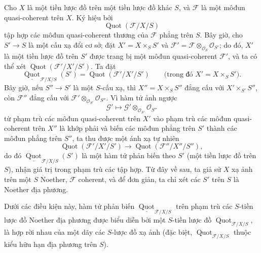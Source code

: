 
Cho $X$ là một tiền lược đồ trên một tiền lược đồ khác $S$, và $\mathcal F$ là
một môđun quasi-coherent trên $X$. Ký hiệu bởi
\[
\operatorname{Quot}(\mathcal F/X/S)
\]
tập hợp các môđun quasi-coherent thương của $\mathcal F$ phẳng trên $S$. Bây
giờ, cho $S'\longrightarrow S$ là một cấu xạ đổi cơ sở; đặt
$X'=X\times_S S'$ và
$\mathcal F'=\mathcal F\otimes_{\mathcal O_S}\mathcal O_{S'}$; do đó, $X'$
là một tiền lược đồ trên $S'$ được trang bị một môđun
quasi-coherent $\mathcal F'$, và ta có thể xét
$\operatorname{Quot}(\mathcal F'/X'/S')$. Ta đặt
\[
\underline{\operatorname{Quot}}_{\mathcal F/X/S}(S')
=\operatorname{Quot}(\mathcal F'/X'/S')
\qquad\text{(trong đó $X'=X\times_SS'$)}.
\]
Bây giờ, nếu $S''\longrightarrow S'$ là một $S$-cấu xạ, thì
$X''=X\times_SS''$ đẳng cấu với $X'\times_{S'}S''$, còn $\mathcal F''$ đẳng
cấu với $\mathcal F'\otimes_{\mathcal O_{S'}}\mathcal O_{S''}$. Vì hàm tử ảnh
ngược
\[
\mathcal G'\longmapsto
\mathcal G'\otimes_{\mathcal O_{S'}}\mathcal O_{S''}
\]
từ phạm trù các môđun quasi-coherent trên $X'$ vào phạm trù các môđun
quasi-coherent trên $X''$ là khớp phải và biến các môđun phẳng trên $S'$ thành
các môđun phẳng trên $S''$, ta thu được một ánh xạ tự nhiên
\[
\operatorname{Quot}(\mathcal F'/X'/S')\longrightarrow
\operatorname{Quot}(\mathcal F''/X''/S''),
\]
do đó $\underline{\operatorname{Quot}}_{\mathcal F/X/S}(S')$ là một hàm tử
phản biến theo $S'$ (một tiền lược đồ trên $S$), nhận giá trị trong phạm trù
các tập hợp. Từ đây về sau, ta giả sử $X$ xạ ảnh trên một $S$ Noether,
$\mathcal F$ coherent, và để đơn giản, ta chỉ xét các $S'$ trên $S$ là
Noether địa phương.

 Dưới các điều kiện này, hàm tử phản biến
$\underline{\operatorname{Quot}}_{\mathcal F/X/S}$ trên phạm trù các
$S$-tiền lược đồ Noether địa phương được biểu diễn bởi một $S$-tiền lược đồ
$\operatorname{Quot}_{\mathcal F/X/S}$, là hợp rời nhau của một dãy các
$S$-lược đồ xạ ảnh (đặc biệt,
$\operatorname{Quot}_{\mathcal F/X/S}$ thuộc kiểu hữu hạn địa phương trên
$S$).

